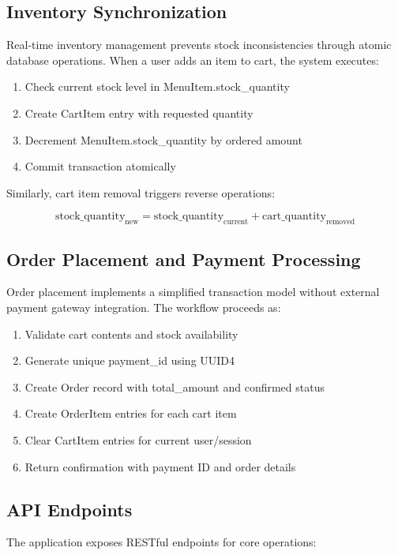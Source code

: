 \documentclass{ieeeaccess}
\begin{document}
\subsection{Inventory Synchronization}
Real-time inventory management prevents stock inconsistencies through atomic database operations. When a user adds an item to cart, the system executes:

\begin{enumerate}
\item Check current stock level in MenuItem.stock\_quantity
\item Create CartItem entry with requested quantity
\item Decrement MenuItem.stock\_quantity by ordered amount
\item Commit transaction atomically
\end{enumerate}

Similarly, cart item removal triggers reverse operations:

\begin{equation}
\text{stock\_quantity}_{\text{new}} = \text{stock\_quantity}_{\text{current}} + \text{cart\_quantity}_{\text{removed}}
\label{eq:stock_update}
\end{equation}

\subsection{Order Placement and Payment Processing}
Order placement implements a simplified transaction model without external payment gateway integration. The workflow proceeds as:

\begin{enumerate}
\item Validate cart contents and stock availability
\item Generate unique payment\_id using UUID4
\item Create Order record with total\_amount and confirmed status
\item Create OrderItem entries for each cart item
\item Clear CartItem entries for current user/session
\item Return confirmation with payment ID and order details
\end{enumerate}

\subsection{API Endpoints}
The application exposes RESTful endpoints for core operations:
\end{document}
